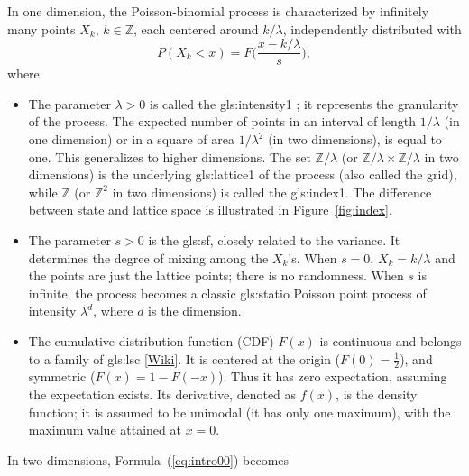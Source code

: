 \documentclass[10pt]{article}
\begin{document}
In one dimension, the \textcolor{index}{Poisson-binomial process} is characterized by infinitely many points $X_k$, $k\in\mathbb{Z}$, each centered around $k/\lambda$, independently distributed with
\begin{equation}
P(X_k<x)=F\Big(\frac{x-k/\lambda}{s}\Big),\label{eq:intro00}
\end{equation}
where
\begin{itemize}
\item The parameter $\lambda>0$  is called the
\gls{gls:intensity1}%
;
it represents the granularity of the process. The expected number of points in an interval of length $1/\lambda$ (in one dimension) or in a square of area $1/\lambda^2$ (in two dimensions),
is equal to one. This generalizes to higher dimensions.
The set $\mathbb{Z}/\lambda$ (or $\mathbb{Z}/\lambda \times \mathbb{Z}/\lambda$ in two dimensions)
 is the underlying
\gls{gls:lattice1} %
 of the process (also called the \textcolor{index}{grid}), while $\mathbb{Z}$ (or $\mathbb{Z}^2$ in two dimensions) is called the \gls{gls:index1}. The difference between state and lattice space is illustrated in Figure~\ref{fig:index}.
\item The parameter $s >0$ is the
\gls{gls:sf},
closely related to the variance. It determines the degree of mixing among the $X_k$'s. When $s=0$, $X_k=k/\lambda$ and the points are just the lattice points; there is no randomness. When $s$ is infinite, the process becomes a classic \gls{gls:statio} Poisson point process of intensity $\lambda^d$, where $d$ is the dimension.
\item The cumulative distribution function (CDF) $F(x)$ is continuous and belongs to a family of
\gls{gls:lsc} %
[\href{https://en.wikipedia.org/wiki/Location-scale_family}{Wiki}]. It is centered at the origin ($F(0)=\frac{1}{2}$), and symmetric ($F(x)=1-F(-x)$). Thus it has zero expectation, assuming the expectation exists. Its derivative, denoted as $f(x)$, is the density function; it is assumed to be unimodal (it has only one maximum), with the maximum value attained at $x=0$.
\end{itemize}
\noindent In two dimensions, Formula~(\ref{eq:intro00}) becomes
\end{document}
